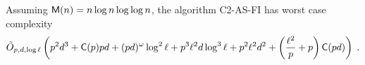 \begin{theorem}
  \label{th:complexity}
  Assuming $\mathsf{M}(n) = n\log n\log\log n$, the algorithm C2-AS-FI has
  worst case complexity
  \begin{equation*}
    \tilde{O}_{p,d,\log\ell}\left(
      p^2d^3 +
      \mathsf{C}(p)pd +
      (pd)^\omega\log^2\ell +
      p^3\ell^2 d\log^3\ell + 
      p^2\ell^2 d^2+
      \left(\frac{\ell^2}{p} + p\right)\mathsf{C}(pd)
    \right)
    \;\text{.}
  \end{equation*}
\end{theorem}



%
